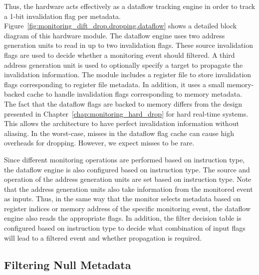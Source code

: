 Thus, the hardware acts effectively as a dataflow tracking engine in order to
track a 1-bit invalidation flag per metadata.
Figure~\ref{fig:monitoring_dift_drop.dropping.dataflow} shows a detailed block
diagram of this hardware module. The dataflow engine uses two address
generation units to read in up to two invalidation flags. These source
invalidation flags are used to decide whether a monitoring event should
filtered. A third address generation unit is used to optionally specify a
target to propagate the invalidation information. The module includes a
register file to store invalidation flags corresponding to register file
metadata. In addition, it uses a small memory-backed cache to handle
invalidation flags corresponding to memory metadata. The fact that the dataflow
flags are backed to memory differs from the design presented in
Chapter~\ref{chap:monitoring_hard_drop} for hard real-time systems. This allows
the architecture to have perfect invalidation information without aliasing. In
the worst-case, misses in the dataflow flag cache can cause high overheads for
dropping. However, we expect misses to be rare.

Since different monitoring operations are performed based on instruction type,
the dataflow engine is also configured based on instruction type. The source
and operation of the address generation units are set based on instruction
type. Note that the address generation units also take information from the
monitored event as inputs. Thus, in the same way that the monitor selects
metadata based on register indices or memory address of the specific monitoring
event, the dataflow engine also reads the appropriate flags. In addition, the
filter decision table is configured based on instruction type to decide what
combination of input flags will lead to a filtered event and whether
propagation is required.

\subsection{Filtering Null Metadata}
\label{sec:monitoring_dift_drop.dropping.null_filtering}

